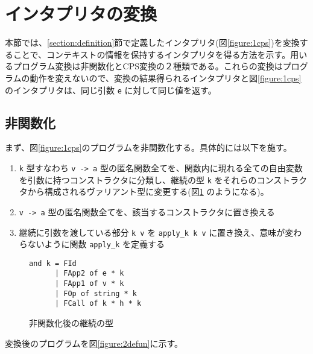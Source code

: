 \section{インタプリタの変換}
\label{section:transform}

本節では、\ref{section:definition}節で定義したインタプリタ(図\ref{figure:1cps})を変換することで、コンテキストの情報を保持するインタプリタを得る方法を示す。用いるプログラム変換は非関数化とCPS変換の２種類である。これらの変換はプログラムの動作を変えないので、変換の結果得られるインタプリタと図\ref{figure:1cps}のインタプリタは、同じ引数 \texttt{e} に対して同じ値を返す。

\subsection{非関数化}
\label{section:2defun}

まず、図\ref{figure:1cps}のプログラムを非関数化する。具体的には以下を施す。
\begin{enumerate}
\item \texttt{k} 型すなわち \texttt{v -> a} 型の匿名関数全てを、関数内に現れる全ての自由変数を引数に持つコンストラクタに分類し、継続の型 \texttt{k} をそれらのコンストラクタから構成されるヴァリアント型に変更する(図\ref{figure:k_2defun} のようになる)。
\item \texttt{v -> a} 型の匿名関数全てを、該当するコンストラクタに置き換える
\item 継続に引数を渡している部分 \texttt{k v} を \texttt{apply\_k k v} に置き換え、意味が変わらないように関数 \texttt{apply\_k} を定義する
\end{enumerate}

\begin{figure}
\begin{verbatim}
and k = FId
      | FApp2 of e * k
      | FApp1 of v * k
      | FOp of string * k
      | FCall of k * h * k
\end{verbatim}
\caption{非関数化後の継続の型}
\label{figure:k_2defun}
\end{figure}

変換後のプログラムを図\ref{figure:2defun}に示す。

